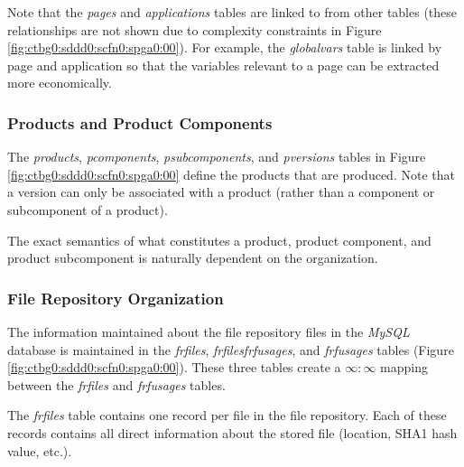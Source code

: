 Note that the \emph{pages} and \emph{applications} tables are linked to
from other tables (these relationships are not shown due to complexity constraints
in Figure \ref{fig:ctbg0:sddd0:scfn0:spga0:00}).  For
example, the \emph{globalvars} table is linked by page and application
so that the variables relevant to a page can be extracted more economically.


\subsubsection{Products and Product Components}
\label{ctbg0:sddd0:scfn0:spcn0}

The \emph{products}, \emph{pcomponents}, \emph{psubcomponents}, 
and \emph{pversions} tables in Figure \ref{fig:ctbg0:sddd0:scfn0:spga0:00}
define the products that are produced.  Note that a version can only
be associated with a product (rather than a component or subcomponent
of a product).

The exact semantics of what constitutes a product, product component,
and product subcomponent is naturally dependent on the organization.


\subsubsection{File Repository Organization}
\label{ctbg0:sddd0:scfn0:sfro0}

The information maintained about the file repository files in the
\emph{MySQL} database is maintained in the \emph{frfiles},
\emph{frfilesfrfusages}, and \emph{frfusages} tables
(Figure \ref{fig:ctbg0:sddd0:scfn0:spga0:00}).  These three
tables create a $\infty{}:\infty{}$ mapping between
the \emph{frfiles} and \emph{frfusages} tables.

The \emph{frfiles} table contains one record per file in the
file repository.  Each of these records contains all direct information
about the stored file (location, SHA1 hash value, etc.).

